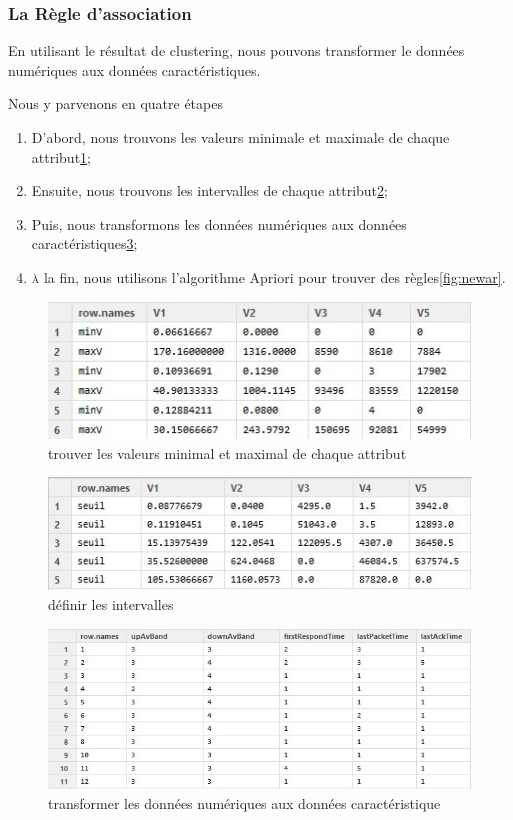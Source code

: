 \subsubsection{La Règle d'association}
En utilisant le résultat de clustering, nous pouvons transformer le données numériques aux données caractéristiques. 

Nous y parvenons en quatre étapes
\begin{enumerate}
\item D'abord, nous trouvons les valeurs minimale et maximale de chaque attribut\ref{fig:max-min1};
\item Ensuite, nous trouvons les intervalles de chaque attribut\ref{fig:seuil};
\item Puis, nous transformons les données numériques aux données caractéristiques\ref{fig:newData2};
\item \textsc{à} la fin, nous utilisons l'algorithme Apriori pour trouver des règles\ref{fig:newar}. 
\end{enumerate}
\begin{figure}[H]
\centering
\includegraphics[width=0.8\linewidth]{images/max-min1}
\caption{trouver les valeurs minimal et maximal de chaque attribut}
\label{fig:max-min1}
\end{figure}


\begin{figure}[H]
\centering
\includegraphics[width=0.8\linewidth]{images/seuil}
\caption{définir les intervalles}
\label{fig:seuil}
\end{figure}

\begin{figure}[H]
\centering
\includegraphics[width=0.8\linewidth]{images/newData2}
\caption{transformer les données numériques aux données caractéristique}
\label{fig:newData2}
\end{figure}

